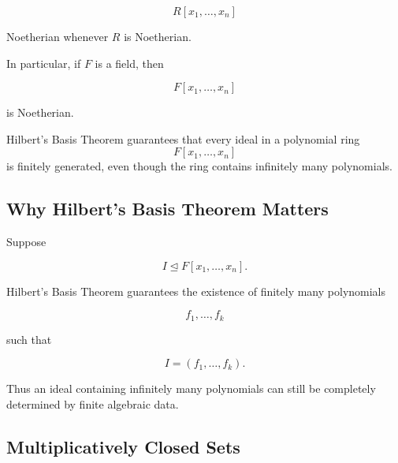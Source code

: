 \[ R[x_1,\ldots,x_n] \]

Noetherian whenever \(R\) is Noetherian.

In particular, if \(F\) is a field, then

\[ F[x_1,\ldots,x_n] \]

is Noetherian.

\begin{importantbox}
Hilbert's Basis Theorem guarantees that every ideal in a polynomial ring
\[ F[x_1,\ldots,x_n] \]
is finitely generated, even though the ring contains infinitely many
polynomials.
\end{importantbox}

\subsection{Why Hilbert's Basis Theorem Matters}
\label{subsec:why-hilbert-basis-matters}

Suppose

\[ I\trianglelefteq F[x_1,\ldots,x_n]. \]

Hilbert's Basis Theorem guarantees the existence of finitely many
polynomials

\[ f_1,\ldots,f_k \]

such that

\[ I=(f_1,\ldots,f_k). \]

Thus an ideal containing infinitely many polynomials can still be completely
determined by finite algebraic data.

\begin{center}
\end{center}

\subsection{Multiplicatively Closed Sets}
\label{subsec:multiplicatively-closed-sets}


